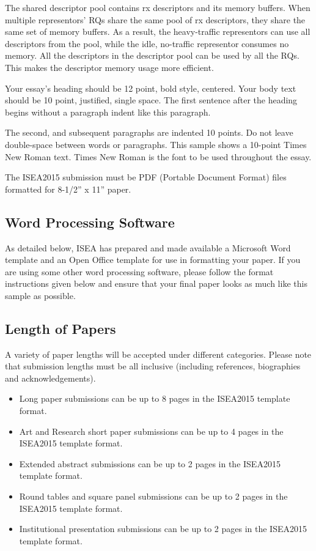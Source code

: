\documentclass[letterpaper]{article}
\begin{document}
The shared descriptor pool contains rx descriptors and its memory
buffers. When multiple representors' RQs share the same pool of rx
descriptors, they share the same set of memory buffers. As a result,
the heavy-traffic representors can use all descriptors from the pool,
while the idle, no-traffic representor consumes no memory. All the
descriptors in the descriptor pool can be used by all the RQs. This
makes the descriptor memory usage more efficient.


Your essay’s heading should be 12 point, bold style, centered. Your body text should be 10 point, justified, single space. The first sentence after the heading begins without a paragraph indent like this paragraph.

The second, and subsequent paragraphs are indented 10 points. Do  not  leave  double-space  between   words  or  paragraphs. This sample shows a 10-point Times New Roman text. Times New  Roman  is  the font to be used throughout the essay.

The ISEA2015 submission must be PDF (Portable Document Format) files formatted for 8-1/2'' x 11'' paper.

\subsection{Word Processing Software}

As detailed below, ISEA has prepared and made available a Microsoft Word template and an Open Office template for use in formatting your paper. If you are using some other word processing software, please follow the format instructions given below and ensure that your final paper looks as much like this sample as possible.

\subsection{Length of Papers}

A variety of paper lengths will be accepted under different categories. Please note that submission lengths must be all inclusive (including references, biographies and acknowledgements).
\begin{itemize}
\item Long paper submissions can be up to 8 pages in the ISEA2015 template format.
\item Art and Research short paper submissions can be up to 4 pages in the ISEA2015 template format.
\item Extended abstract submissions can be up to 2 pages in the ISEA2015 template format.
\item Round tables and square panel submissions can be up to 2 pages in the ISEA2015 template format.
\item Institutional presentation submissions can be up to 2 pages in the ISEA2015 template format.
\end{itemize}
\end{document}

